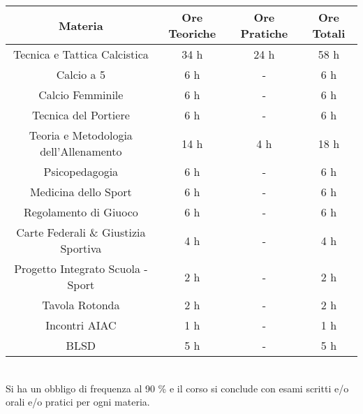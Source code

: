 \documentclass[../uefaC.tex]{subfiles}
\begin{document}
\begin{table}[]
\begin{tabular}{|c|c|c|c|}
\hline
\textbf{Materia}                      & \textbf{Ore Teoriche} & \textbf{Ore Pratiche} & \textbf{Ore Totali} \\ \hline
Tecnica e Tattica Calcistica          & 34 h                  & 24 h                  & 58 h                \\ \hline
Calcio a 5                            & 6 h                   & -                     & 6 h                 \\ \hline
Calcio Femminile                      & 6 h                   & -                     & 6 h                 \\ \hline
Tecnica del Portiere                  & 6 h                   & -                     & 6 h                 \\ \hline
Teoria e Metodologia dell'Allenamento & 14 h                  & 4 h                   & 18 h                \\ \hline
Psicopedagogia                        & 6 h                   & -                     & 6 h                 \\ \hline
Medicina dello Sport                  & 6 h                   & -                     & 6 h                 \\ \hline
Regolamento di Giuoco                 & 6 h                   & -                     & 6 h                 \\ \hline
Carte Federali \& Giustizia Sportiva  & 4 h                   & -                     & 4 h                 \\ \hline
Progetto Integrato Scuola - Sport     & 2 h                   & -                     & 2 h                 \\ \hline
Tavola Rotonda                        & 2 h                   & -                     & 2 h                 \\ \hline
Incontri AIAC                         & 1 h                   & -                     & 1 h                 \\ \hline
BLSD                                  & 5 h                   & -                     & 5 h                 \\ \hline
\end{tabular}
\end{table}

\hfill \\


Si ha un obbligo di frequenza al 90 \% e il corso si conclude con esami scritti e/o orali e/o pratici per ogni materia.
\end{document}

